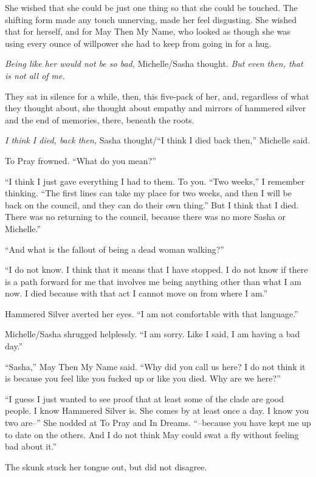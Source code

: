 She wished that she could be just one thing so that she could be touched. The shifting form made any touch unnerving, made her feel disgusting. She wished that for herself, and for May Then My Name, who looked as though she was using every ounce of willpower she had to keep from going in for a hug.

\emph{Being like her would not be so bad,} Michelle/Sasha thought. \emph{But even then, that is not all of me.}

They sat in silence for a while, then, this five-pack of her, and, regardless of what they thought about, she thought about empathy and mirrors of hammered silver and the end of memories, there, beneath the roots.

\emph{I think I died, back then,} Sasha thought/``I think I died back then,'' Michelle said.

To Pray frowned. ``What do you mean?''

``I think I just gave everything I had to them. To you. ``Two weeks,'' I remember thinking. ``The first lines can take my place for two weeks, and then I will be back on the council, and they can do their own thing.'' But I think that I died. There was no returning to the council, because there was no more Sasha or Michelle.''

``And what is the fallout of being a dead woman walking?''

``I do not know. I think that it means that I have stopped. I do not know if there is a path forward for me that involves me being anything other than what I am now. I died because with that act I cannot move on from where I am.''

Hammered Silver averted her eyes. ``I am not comfortable with that language.''

Michelle/Sasha shrugged helplessly. ``I am sorry. Like I said, I am having a bad day.''

``Sasha,'' May Then My Name said. ``Why did you call us here? I do not think it is because you feel like you fucked up or like you died. Why are we here?''

``I guess I just wanted to see proof that at least some of the clade are good people. I know Hammered Silver is. She comes by at least once a day. I know you two are--'' She nodded at To Pray and In Dreams. ``--because you have kept me up to date on the others. And I do not think May could swat a fly without feeling bad about it.''

The skunk stuck her tongue out, but did not disagree.

